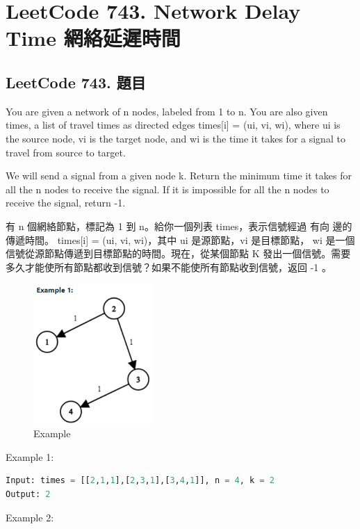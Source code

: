 \documentclass[10pt,UTF8]{ctexart}
\begin{document}
\newpage

\section{LeetCode 743. Network Delay Time 網絡延遲時間}

\subsection{LeetCode 743. 題目}

You are given a network of n nodes, labeled from 1 to n. You are also given times, a list of travel times as directed edges times[i] = (ui, vi, wi), where ui is the source node, vi is the target node, and wi is the time it takes for a signal to travel from source to target.

We will send a signal from a given node k. Return the minimum time it takes for all the n nodes to receive the signal. If it is impossible for all the n nodes to receive the signal, return -1.

有 n 個網絡節點，標記為 1 到 n。給你一個列表 times，表示信號經過 有向 邊的傳遞時間。 times[i] = (ui, vi, wi)，其中 ui 是源節點，vi 是目標節點， wi 是一個信號從源節點傳遞到目標節點的時間。現在，從某個節點 K 發出一個信號。需要多久才能使所有節點都收到信號？如果不能使所有節點收到信號，返回 -1 。

\begin{figure}[H]
\centering 
\includegraphics[width=0.40\textwidth]{lc-743-p-example.png} 
\caption{Example}
\label{Test}
\end{figure}

Example 1:

\begin{lstlisting}[language={python}]
Input: times = [[2,1,1],[2,3,1],[3,4,1]], n = 4, k = 2
Output: 2
\end{lstlisting}

Example 2:
\end{document}
